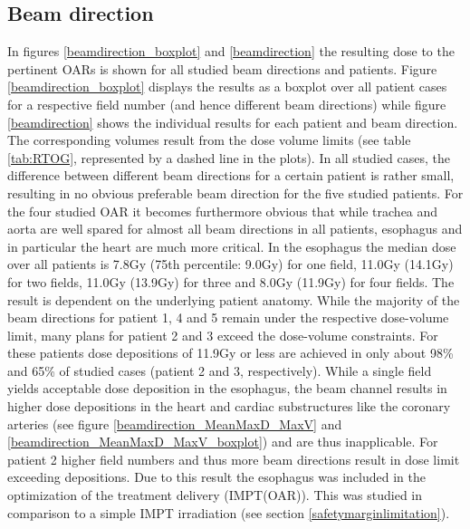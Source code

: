 \vspace*{-0.3cm}

\subsection{Beam direction}
\label{human:beamdirection}
In figures \ref{beamdirection_boxplot} and \ref{beamdirection} the resulting dose to the pertinent OARs is shown for all studied beam 
directions and patients. Figure \ref{beamdirection_boxplot} displays the results as a boxplot over all patient cases for a respective field 
number (and hence different beam directions) while figure \ref{beamdirection} shows the individual results for each patient and beam direction. 
The corresponding volumes result from the dose volume limits (see table \ref{tab:RTOG}, represented by a dashed line in the plots). 
In all studied cases, the difference between different beam directions for a certain patient is rather small, resulting in no obvious 
preferable beam direction for the five studied patients. For the four studied OAR it becomes furthermore obvious that while trachea and aorta 
are well spared for almost all beam directions in all patients, esophagus and in particular the heart are much more 
critical.\newline
\newline
In the esophagus the median dose over all patients is 7.8Gy (75th percentile: 9.0Gy) for one field, 11.0Gy (14.1Gy) for 
two fields, 11.0Gy (13.9Gy) for three and 8.0Gy (11.9Gy) for four fields. The result is dependent on the underlying patient anatomy. 
While the majority of the beam directions for patient 1, 4 and 5 remain under the respective dose-volume limit, many plans for patient 2 and 3 
exceed the dose-volume constraints. For these patients dose depositions of 11.9Gy or less are achieved in only about 98\% and 65\% of 
studied cases (patient 2 and 3, respectively). While a single field yields acceptable dose deposition in the esophagus, the beam channel 
results in higher dose depositions in the heart and cardiac substructures like the coronary arteries (see 
figure \ref{beamdirection_MeanMaxD_MaxV} and \ref{beamdirection_MeanMaxD_MaxV_boxplot}) and are thus 
inapplicable. For patient 2 higher field numbers and thus more beam directions result in dose limit exceeding depositions. Due to this 
result the esophagus was included in the optimization of the treatment delivery (IMPT(OAR)). This was studied in comparison 
to a simple IMPT irradiation (see section \ref{safetymarginlimitation}).

